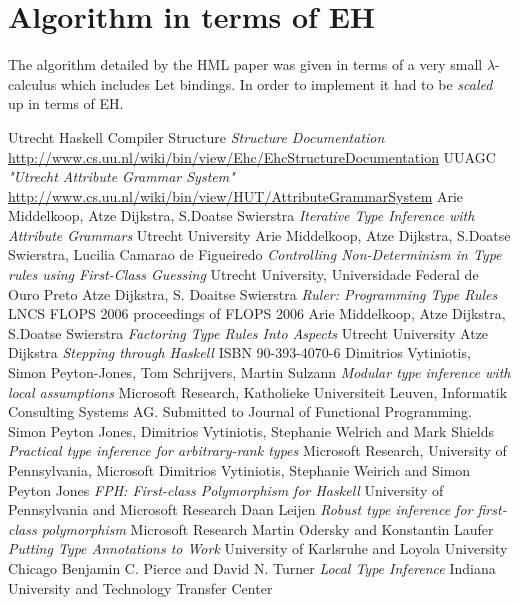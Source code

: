 \documentclass[12pt, a4paper, oneside]{article}
\begin{document}
\section{Algorithm in terms of EH}
The algorithm detailed by the HML paper was given in terms of a very small $\lambda$-calculus which includes Let bindings. In order to implement it had to be \emph{scaled} up in terms of EH.
\begin{thebibliography}{9}
  Utrecht Haskell Compiler Structure
  \emph{Structure Documentation}
   \url{http://www.cs.uu.nl/wiki/bin/view/Ehc/EhcStructureDocumentation}
  UUAGC
  \emph{"Utrecht Attribute Grammar System"}
   \url{http://www.cs.uu.nl/wiki/bin/view/HUT/AttributeGrammarSystem}
  Arie Middelkoop, Atze Dijkstra, S.Doatse Swierstra
  \emph{Iterative Type Inference with Attribute Grammars}
  Utrecht University
  Arie Middelkoop, Atze Dijkstra, S.Doatse Swierstra, Lucilia Camarao de Figueiredo
  \emph{Controlling Non-Determinism in Type rules using First-Class Guessing}
  Utrecht University, Universidade Federal de Ouro Preto
  Atze Dijkstra, S. Doaitse Swierstra 
  \emph{Ruler: Programming Type Rules}
  LNCS FLOPS 2006 proceedings of FLOPS 2006
  Arie Middelkoop, Atze Dijkstra, S.Doatse Swierstra
  \emph{Factoring Type Rules Into Aspects}
  Utrecht University
  Atze Dijkstra
  \emph{Stepping through Haskell}
  ISBN 90-393-4070-6
  Dimitrios Vytiniotis, Simon Peyton-Jones, Tom Schrijvers, Martin Sulzann
  \emph{Modular type inference with local assumptions}
  Microsoft Research, Katholieke Universiteit Leuven, Informatik Consulting Systems AG.
  Submitted to Journal of Functional Programming.
  Simon Peyton Jones, Dimitrios Vytiniotis, Stephanie Welrich and Mark Shields
  \emph{Practical type inference for arbitrary-rank types}
  Microsoft Research, University of Pennsylvania, Microsoft
  Dimitrios Vytiniotis, Stephanie Weirich and Simon Peyton Jones
  \emph{FPH: First-class Polymorphism for Haskell}
  University of Pennsylvania and Microsoft Research
  Daan Leijen
  \emph{Robust type inference for first-class polymorphism}
  Microsoft Research
  Martin Odersky and Konstantin Laufer
  \emph{Putting Type Annotations to Work}
  University of Karlsruhe and Loyola University Chicago
  Benjamin C. Pierce and David N. Turner
  \emph{Local Type Inference}
  Indiana University and Technology Transfer Center
\end{thebibliography}
\end{document}

